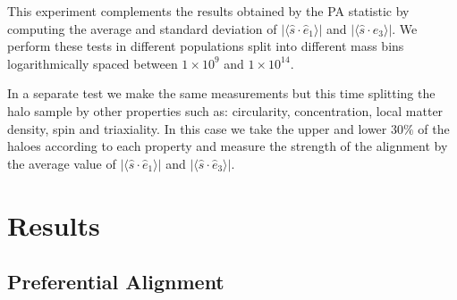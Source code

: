\documentclass[useAMS,usenatbib]{mn2e}
\newcommand{\hMsun}{{\ifmmode{h^{-1}{\rm
        {M_{\odot}}}}\else{$h^{-1}{\rm{M_{\odot}}}$~}\fi}}
\begin{document}
This experiment complements the results obtained by the PA statistic by
computing the average and standard deviation of
$\vert\langle\hat{s}\cdot\hat{e}_1\rangle\vert$ and
$\vert\langle\hat{s}\cdot\hat{e}_3\rangle\vert$.  We perform these
tests in different populations split into different mass bins
logarithmically spaced between $1\times 10^{9}$ and
$1\times10^{14}$\hMsun. 

In a separate test we make the same measurements but this time
splitting the halo sample by other properties such as:
circularity, concentration, local matter density, spin and
triaxiality. In this case we take the upper and lower $30\%$ of the
haloes according to each property and measure the strength of the
alignment by the average value of
$\vert\langle\hat{s}\cdot\hat{e}_1\rangle\vert$ and
$\vert\langle\hat{s}\cdot\hat{e}_3\rangle\vert$.

\section{Results}
\label{sec:results}


\subsection{Preferential Alignment}
\end{document}
